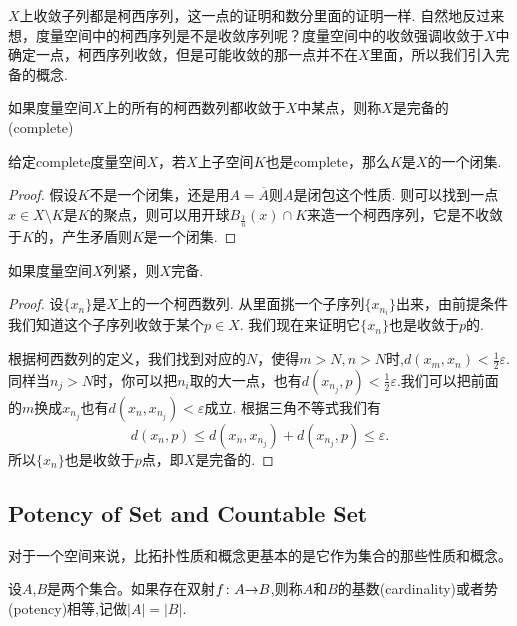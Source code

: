 $X$上收敛子列都是柯西序列，这一点的证明和数分里面的证明一样. 自然地反过来想，度量空间中的柯西序列是不是收敛序列呢？度量空间中的收敛强调收敛于$X$中确定一点，柯西序列收敛，但是可能收敛的那一点并不在$X$里面，所以我们引入完备的概念.

\begin{definition}[完备性]
如果度量空间$X$上的所有的柯西数列都收敛于$X$中某点，则称$X$是完备的(complete)
\end{definition}

\begin{proposition}
\rm 给定complete度量空间$X$，若$X$上子空间$K$也是complete，那么$K$是$X$的一个闭集.
\end{proposition}

\begin{proof}
假设$K$不是一个闭集，还是用$A = \overline{A}$则$A$是闭包这个性质. 则可以找到一点$x \in  X \setminus K$是$K$的聚点，则可以用开球$B_\frac{1}{n}(x) \cap K$来造一个柯西序列，它是不收敛于$K$的，产生矛盾则$K$是一个闭集.
\end{proof}

\begin{proposition}
如果度量空间$X$列紧，则$X$完备.
\end{proposition}

\begin{proof}
设$\{x_n\}$是$X$上的一个柯西数列. 从里面挑一个子序列$\{x_{n_i}\}$出来，由前提条件我们知道这个子序列收敛于某个$p \in X$. 我们现在来证明它$\{x_n\}$也是收敛于$p$的.

根据柯西数列的定义，我们找到对应的$N$，使得$m > N,n >N$时,$d(x_m,x_n) < \frac{1}{2}\varepsilon$. 同样当$n_j > N$时，你可以把$n_i$取的大一点，也有$d(x_{n_j},p) < \frac{1}{2}\varepsilon$.我们可以把前面的$m$换成$x_{n_j}$也有$d(x_n,x_{n_j})< \varepsilon$成立. 根据三角不等式我们有\[d(x_n,p) \leq d(x_n,x_{n_j}) + d(x_{n_j},p) \leq \varepsilon.\]所以$\{x_n\}$也是收敛于$p$点，即$X$是完备的.
\end{proof}

\newpage
\subsection{Potency of Set and Countable Set}

对于一个空间来说，比拓扑性质和概念更基本的是它作为集合的那些性质和概念。

\begin{definition}
设$A$,$B$是两个集合。如果存在双射${f}\colon{A}{\to}{B}$,则称$A$和$B$的基数(cardinality)或者势(potency)相等,记做$|A|=|B|$.
\end{definition}

